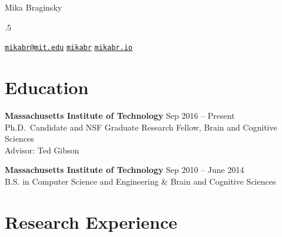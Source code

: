 \documentclass[11pt,]{article}
\begin{document}
\centerline{\huge Mika Braginsky}

\vspace{1.5 mm}

\footnotesize


\moveleft.5\hoffset\centerline{
      \scalebox{1.2}{\faEnvelope}\hspace{.5 mm}
    \href{mailto:}{\tt \href{mailto:mikabr@mit.edu}{\nolinkurl{mikabr@mit.edu}}} \hspace{2 mm}
        \scalebox{1.4}{\faGithub}\hspace{.5 mm}
    \href{http://github.com/mikabr}{\tt mikabr} \hspace{2 mm}
        \scalebox{1.2}{\faLink}\hspace{.5 mm}
    \href{http://mikabr.io}{\tt mikabr.io} \hspace{2 mm}
    }
\normalsize

\hypertarget{education}{%
\section{Education}\label{education}}

\textbf{Massachusetts Institute of Technology} \hfill Sep 2016 --
Present\\
\hspace*{0.333em}\hspace*{0.333em}\hspace*{0.333em}\hspace*{0.333em}Ph.D.~Candidate
and NSF Graduate Research Fellow, Brain and Cognitive Sciences\\
\hspace*{0.333em}\hspace*{0.333em}\hspace*{0.333em}\hspace*{0.333em}Advisor:
Ted Gibson

\textbf{Massachusetts Institute of Technology} \hfill Sep 2010 -- June
2014\\
\hspace*{0.333em}\hspace*{0.333em}\hspace*{0.333em}\hspace*{0.333em}B.S.
in Computer Science and Engineering \& Brain and Cognitive Sciences

\hypertarget{research-experience}{%
\section{Research Experience}\label{research-experience}}
\end{document}
